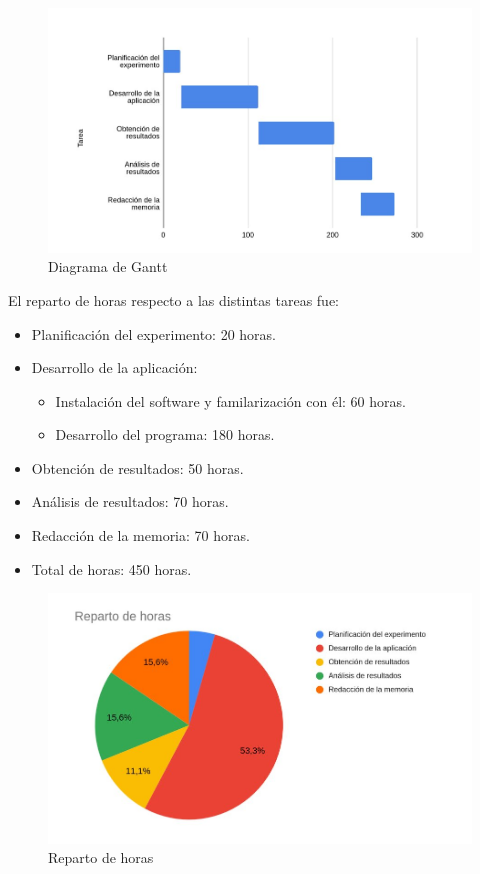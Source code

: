 \documentclass[a4paper,11pt, oneside]{book}
\begin{document}
\begin{figure}[H]
	
	\centering
	\includegraphics[width=\linewidth]{gantt}
	\caption{Diagrama de Gantt}
	\label{fig:gantt}
	
\end{figure}

El reparto de horas respecto a las distintas tareas fue:
\begin{itemize}
	\item Planificación del experimento: 20 horas. 
	\item Desarrollo de la aplicación:
		\begin{itemize}
			\item Instalación del software y familarización con él: 60 horas.
			\item Desarrollo del programa: 180 horas.
		\end{itemize}
	\item Obtención de resultados: 50 horas.
	\item Análisis de resultados: 70 horas.
	\item Redacción de la memoria: 70 horas.
	\item Total de horas: 450 horas.
\end{itemize}

\begin{figure}[H]
	
	\centering
	\includegraphics[width=\linewidth]{horas}
	\caption{Reparto de horas}
	\label{fig:horas}
	
\end{figure}
\end{document}
